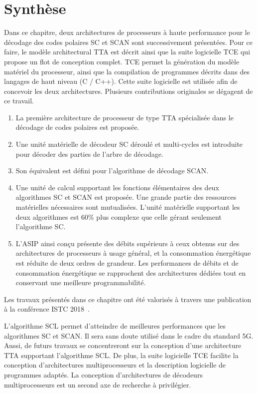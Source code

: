 \section{Synthèse}


Dans ce chapitre, deux architectures de processeurs à haute performance pour le décodage des codes polaires SC et SCAN sont successivement présentées. Pour ce faire, le modèle architectural TTA est décrit ainsi que la suite logicielle TCE qui propose un flot de conception complet. TCE permet la génération du modèle matériel du processeur, ainsi que la compilation de programmes décrits dans des langages de haut niveau (C / C++). Cette suite logicielle est utilisée afin de concevoir les deux architectures. Plusieurs contributions originales se dégagent de ce travail.

\begin{enumerate}[label=(\roman*)]
  \item La première architecture de processeur de type TTA spécialisée dans le décodage de codes polaires est proposée.
  \item Une unité matérielle de décodeur SC déroulé et multi-cycles est introduite pour décoder des parties de l'arbre de décodage.
  \item Son équivalent est défini pour l'algorithme de décodage SCAN.
  \item Une unité de calcul supportant les fonctions élémentaires des deux algorithmes SC et SCAN est proposée. Une grande partie des ressources matérielles nécessaires sont mutualisées. L'unité matérielle supportant les deux algorithmes est 60\% plus complexe que celle gérant seulement l'algorithme SC.
  \item L'ASIP ainsi conçu présente des débits supérieurs à ceux obtenus sur des architectures de processeurs à usage général, et la consommation énergétique est réduite de deux ordres de grandeur. Les performances de débits et de consommation énergétique se rapprochent des architectures dédiées tout en conservant une meilleure programmabilité.
\end{enumerate}

Les travaux présentés dans ce chapitre ont été valorisés à travers une publication à la conférence ISTC 2018~.

L'algorithme SCL permet d'atteindre de meilleures performances que les algorithmes SC et SCAN. Il sera sans doute utilisé dans le cadre du standard 5G. Aussi, de futurs travaux se concentreront sur la conception d'une architecture TTA supportant l'algorithme SCL. De plus, la suite logicielle TCE facilite la conception d'architectures multiprocesseurs et la description logicielle de programmes adaptés. La conception d'architectures de décodeurs multiprocesseurs est un second axe de recherche à privilégier.


